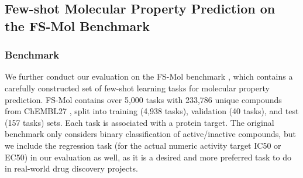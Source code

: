     
    \subsection{Few-shot Molecular Property Prediction on the FS-Mol Benchmark}\label{sec:few-shot-experiments}
    
        \subsubsection{Benchmark}
        We further conduct our evaluation on the FS-Mol benchmark \citep{stanley2021fsmol},
        which contains a carefully constructed set of few-shot learning tasks for molecular property prediction.
        FS-Mol contains over 5,000 tasks with 233,786 unique compounds from ChEMBL27 \citep{mendez2019chembl},
        split into training (4,938 tasks), validation (40 tasks), and test (157 tasks) sets.
        Each task is associated with a protein target. The original benchmark only considers binary classification
        of active/inactive compounds, but we include the regression task (for the actual numeric activity target IC50 or EC50)
        in our evaluation as well, as it is a desired and more preferred task to do in real-world drug discovery projects. 
    
